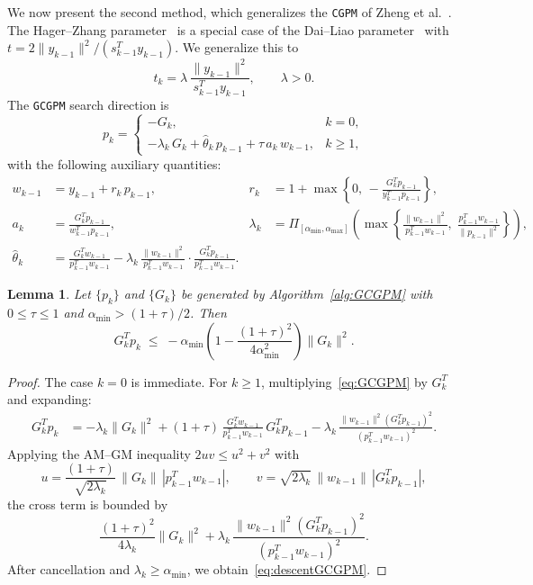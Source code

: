 \documentclass{article}
\theoremstyle{plain}
\newtheorem{lemma}{Lemma}
\theoremstyle{definition}
\theoremstyle{remark}
\newcommand{\norm}[1]{\|#1\|}
\newcommand{\PI}[1]{\Pi_{#1}}
\newcommand{\algoname}[1]{{\small\texttt{#1}}}
\newcommand{\GCGPM}{\algoname{GCGPM}}
\newcommand{\CGPM}{\algoname{CGPM}}
\newcommand{\thetaC}{\hat{\theta}_k}                       %
\begin{document}
We now present the second method, which generalizes the \CGPM{} of Zheng et al.~\cite{zheng2020conjugate}. The Hager--Zhang parameter~\cite{hager2005new} is a special case of the Dai--Liao parameter~\cite{dai2012another} with $t = 2\norm{y_{k-1}}^2/(s_{k-1}^T y_{k-1})$. We generalize this to
\begin{equation}\label{eq:newtk}
  t_k = \lambda\,\frac{\norm{y_{k-1}}^2}{s_{k-1}^T y_{k-1}}, \qquad \lambda > 0.
\end{equation}
The \GCGPM{} search direction is
\begin{equation}\label{eq:GCGPM}
  p_k = \begin{cases}
    -G_k, & k = 0, \\[6pt]
    -\lambda_k\, G_k + \thetaC\, p_{k-1} + \tau\, a_k\, w_{k-1}, & k \geq 1,
  \end{cases}
\end{equation}
with the following auxiliary quantities:
\begin{align}
  w_{k-1} &= y_{k-1} + r_k\, p_{k-1}, &
  r_k &= 1 + \max\!\left\{0,\, -\frac{G_k^T p_{k-1}}{y_{k-1}^T p_{k-1}}\right\}, \label{eq:wk}\\[4pt]
  a_k &= \frac{G_k^T p_{k-1}}{w_{k-1}^T p_{k-1}}, &
  \lambda_k &= \PI{[\alpha_{\min},\alpha_{\max}]}\!\left(\max\!\left\{
    \frac{\norm{w_{k-1}}^2}{p_{k-1}^T w_{k-1}},\;
    \frac{p_{k-1}^T w_{k-1}}{\norm{p_{k-1}}^2}
  \right\}\right), \label{eq:lambdak2}\\[4pt]
  \thetaC &= \frac{G_k^T w_{k-1}}{p_{k-1}^T w_{k-1}}
    - \lambda_k\,\frac{\norm{w_{k-1}}^2}{p_{k-1}^T w_{k-1}}
    \cdot\frac{G_k^T p_{k-1}}{p_{k-1}^T w_{k-1}}. \label{eq:thetaC}
\end{align}

\begin{lemma}\label{lem:descentGCGPM}
Let $\{p_k\}$ and $\{G_k\}$ be generated by Algorithm~\ref{alg:GCGPM} with $0 \leq \tau \leq 1$ and $\alpha_{\min} > (1{+}\tau)/2$. Then
\begin{equation}\label{eq:descentGCGPM}
  G_k^T p_k \;\leq\; -\alpha_{\min}\!\left(1 - \frac{(1+\tau)^2}{4\alpha_{\min}^2}\right)\norm{G_k}^2.
\end{equation}
\end{lemma}
\begin{proof}
The case $k = 0$ is immediate. For $k \geq 1$, multiplying~\eqref{eq:GCGPM} by $G_k^T$ and expanding:
\begin{align*}
  G_k^T p_k &= -\lambda_k\norm{G_k}^2
    + (1{+}\tau)\,\frac{G_k^T w_{k-1}}{p_{k-1}^T w_{k-1}}\,G_k^T p_{k-1}
    - \lambda_k\,\frac{\norm{w_{k-1}}^2(G_k^T p_{k-1})^2}{(p_{k-1}^T w_{k-1})^2}.
\end{align*}
Applying the AM--GM inequality $2uv \leq u^2 + v^2$ with
\[
  u = \frac{(1{+}\tau)}{\sqrt{2\lambda_k}}\,\norm{G_k}\,|p_{k-1}^T w_{k-1}|, \qquad
  v = \sqrt{2\lambda_k}\,\norm{w_{k-1}}\,|G_k^T p_{k-1}|,
\]
the cross term is bounded by
\[
  \frac{(1{+}\tau)^2}{4\lambda_k}\norm{G_k}^2
  + \lambda_k\,\frac{\norm{w_{k-1}}^2(G_k^T p_{k-1})^2}{(p_{k-1}^T w_{k-1})^2}.
\]
After cancellation and $\lambda_k \geq \alpha_{\min}$, we obtain~\eqref{eq:descentGCGPM}.
\end{proof}
\end{document}
